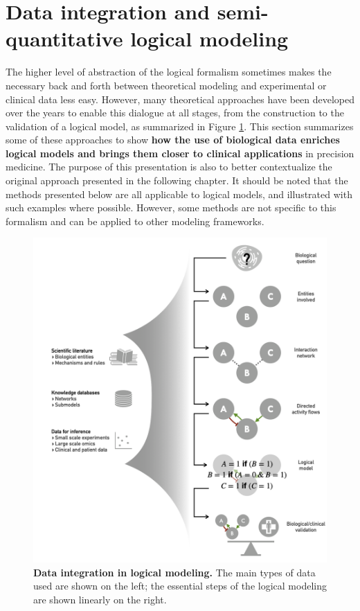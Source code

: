 \documentclass[a4paper,12pt,twoside,onecolumn,openright,final,oldfontcommands]{memoir}
\begin{document}
\section{Data integration and semi-quantitative logical
modeling}\label{logical-data-section}

The higher level of abstraction of the logical formalism sometimes makes
the necessary back and forth between theoretical modeling and
experimental or clinical data less easy. However, many theoretical
approaches have been developed over the years to enable this dialogue at
all stages, from the construction to the validation of a logical model,
as summarized in Figure \ref{fig:logical-data}. This section summarizes
some of these approaches to show \textbf{how the use of biological data
enriches logical models and brings them closer to clinical applications}
in precision medicine. The purpose of this presentation is also to
better contextualize the original approach presented in the following
chapter. It should be noted that the methods presented below are all
applicable to logical models, and illustrated with such examples where
possible. However, some methods are not specific to this formalism and
can be applied to other modeling frameworks.

\begin{figure}

{\centering \includegraphics[width=0.9\linewidth]{fig/logical-data} 

}

\caption[Data integration in logical modeling]{\textbf{Data integration in logical
modeling.} The main types of data used are shown on the left; the
essential steps of the logical modeling are shown linearly on the right.}\label{fig:logical-data}
\end{figure}
\end{document}
